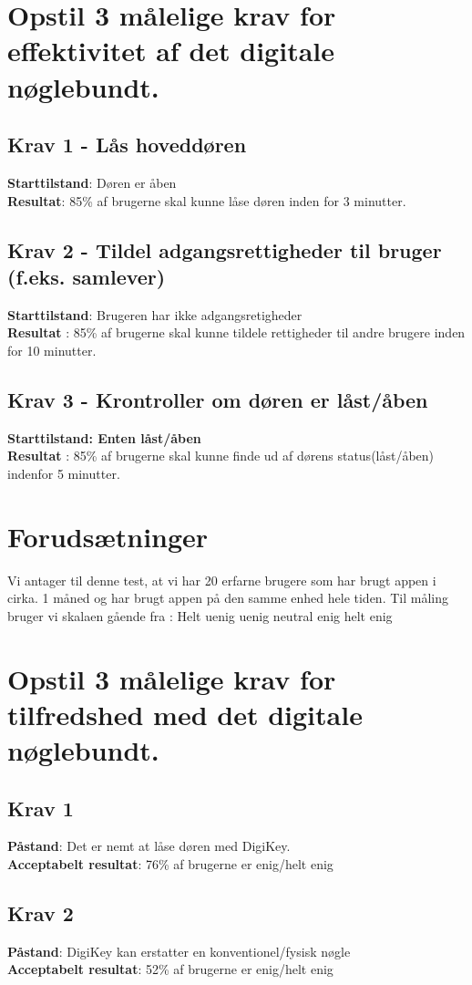 \documentclass[12pt]{article}
\numberwithin{listing}{section}
\begin{document}
\section*{Opstil 3 målelige krav for effektivitet af det digitale nøglebundt.}
\subsection*{Krav 1 - Lås hoveddøren}
\textbf{Starttilstand}: Døren er åben\\
\textbf{Resultat}: 85\% af brugerne skal kunne låse døren inden for 3 minutter.
\subsection*{Krav 2 - Tildel adgangsrettigheder til bruger (f.eks. samlever)}
\textbf{Starttilstand}: Brugeren har ikke adgangsretigheder\\
\textbf{Resultat} : 85\% af brugerne skal kunne tildele rettigheder til andre brugere inden for 10 minutter.
\subsection*{Krav 3 - Krontroller om døren er låst/åben}
\textbf{Starttilstand: Enten l\aa st/\aa ben}\\
\textbf{Resultat} : 85\% af brugerne skal kunne finde ud af dørens status(låst/åben) indenfor 5 minutter.\newpage
\section*{Forudsætninger}
Vi antager til denne test, at vi har 20 erfarne brugere som har brugt appen i cirka. 1 måned og har brugt appen på den samme enhed hele tiden.
Til måling bruger vi skalaen gående fra : Helt uenig uenig neutral enig helt enig\\
\section*{Opstil 3 målelige krav for tilfredshed med det digitale nøglebundt.}
\subsection*{Krav 1}
\textbf{Påstand}: Det er nemt at låse døren med DigiKey.\\
\textbf{Acceptabelt resultat}: 76\% af brugerne er enig/helt enig
\subsection*{Krav 2}
\textbf{Påstand}: DigiKey kan erstatter en konventionel/fysisk nøgle\\
\textbf{Acceptabelt resultat}: 52\% af brugerne er enig/helt enig
\end{document}
